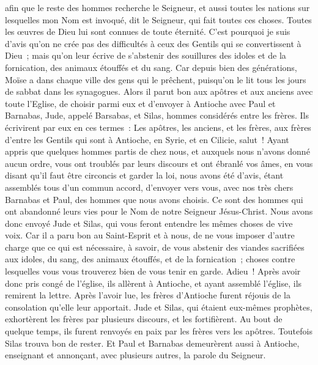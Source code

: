 \begin{multicols}{2}
afin que le reste des hommes recherche le Seigneur, et aussi toutes les nations sur lesquelles mon Nom est invoqué, dit le Seigneur, qui fait toutes ces choses.
Toutes les œuvres de Dieu lui sont connues de toute éternité.
C'est pourquoi je suis d'avis qu'on ne crée pas des difficultés à ceux des Gentils qui se convertissent à Dieu~;
mais qu'on leur écrive de s'abstenir des souillures des idoles et de la fornication, des animaux étouffés et du sang.
Car depuis bien des générations, Moïse a dans chaque ville des gens qui le prêchent, puisqu'on le lit tous les jours de sabbat dans les synagogues.
Alors il parut bon aux apôtres et aux anciens avec toute l'Eglise, de choisir parmi eux et d'envoyer à Antioche avec Paul et Barnabas, Jude, appelé Barsabas, et Silas, hommes considérés entre les frères.
Ils écrivirent par eux en ces termes~: Les apôtres, les anciens, et les frères, aux frères d'entre les Gentils qui sont à Antioche, en Syrie, et en Cilicie, salut~!
Ayant appris que quelques hommes partis de chez nous, et auxquels nous n'avons donné aucun ordre, vous ont troublés par leurs discours et ont ébranlé vos âmes, en vous disant qu'il faut être circoncis et garder la loi,
nous avons été d'avis, étant assemblés tous d'un commun accord, d'envoyer vers vous, avec nos très chers Barnabas et Paul, des hommes que nous avons choisis.
Ce sont des hommes qui ont abandonné leurs vies pour le Nom de notre Seigneur Jésus-Christ.
Nous avons donc envoyé Jude et Silas, qui vous feront entendre les mêmes choses de vive voix.
Car il a paru bon au Saint-Esprit et à nous, de ne vous imposer d'autre charge que ce qui est nécessaire,
à savoir, de vous abstenir des viandes sacrifiées aux idoles, du sang, des animaux étouffés, et de la fornication~; choses contre lesquelles vous vous trouverez bien de vous tenir en garde. Adieu~!
Après avoir donc pris congé de l'église, ils allèrent à Antioche, et ayant assemblé l'église, ils remirent la lettre.
Après l'avoir lue, les frères d'Antioche furent réjouis de la consolation qu'elle leur apportait.
Jude et Silas, qui étaient eux-mêmes prophètes, exhortèrent les frères par plusieurs discours, et les fortifièrent.
Au bout de quelque temps, ils furent renvoyés en paix par les frères vers les apôtres.
Toutefois Silas trouva bon de rester.
Et Paul et Barnabas demeurèrent aussi à Antioche, enseignant et annonçant, avec plusieurs autres, la parole du Seigneur.

\end{multicols}
